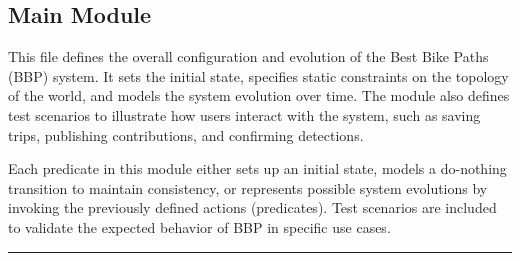 \subsection{Main Module}

This file defines the overall configuration and evolution of the Best Bike Paths (BBP) system. It sets the initial state, specifies static constraints on the topology of the world, and models the system evolution over time. The module also defines test scenarios to illustrate how users interact with the system, such as saving trips, publishing contributions, and confirming detections. 

Each predicate in this module either sets up an initial state, models a do-nothing transition to maintain consistency, or represents possible system evolutions by invoking the previously defined actions (predicates). Test scenarios are included to validate the expected behavior of BBP in specific use cases.

\noindent\rule{\linewidth}{0.4pt} %

